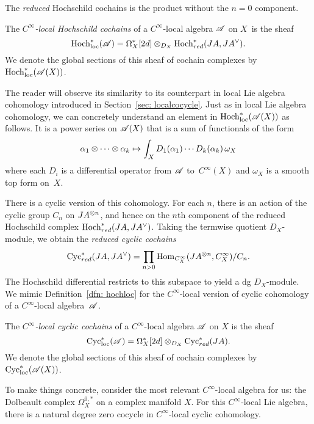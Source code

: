 The {\em reduced} Hochschild cochains is the product without the $n=0$ component. 

\def\Hoch{{\rm Hoch}}
\def\Hochloc{{\rm Hoch}_{\rm loc}}
\def\Cyc{{\rm Cyc}}
\def\Cycloc{{\rm Cyc}_{\rm loc}}

\begin{dfn}\label{dfn: hochloc}
The {\em $C^\infty$-local Hochschild cochains} of a $C^\infty$-local algebra $\mathscr A$ on $X$~is the sheaf
\[
\Hochloc^*(\sA) = \Omega^*_X[2d] \tensor_{D_X} \Hoch^*_{red} (JA, JA^\vee) .
\] 
We denote the global sections of this sheaf of cochain complexes by~$\Hochloc^*(\sA(X))$.
\end{dfn}

The reader will observe its similarity to its counterpart in local Lie algebra cohomology introduced in Section~\ref{sec: localcocycle}. 
Just as in local Lie algebra cohomology, we can concretely understand an element in $\Hochloc^*(\sA(X))$ as follows.
It is a power series on $\mathscr A(X)$ that is a sum of functionals of the form
\[
\alpha_1 \otimes \cdots \otimes \alpha_k \mapsto \int_X  D_1(\alpha_1) \cdots D_k(\alpha_k) \, \omega_X
\]
where each $D_i$ is a differential operator from $\mathscr A$ to~$C^\infty(X)$ and $\omega_X$ is a smooth top form on~$X$. 

There is a cyclic version of this cohomology.
For each $n$, there is an action of the cyclic group $C_n$ on $JA^{\otimes n}$,
and hence on the $n$th component of the reduced Hochschild complex $\Hoch_{red}^* (JA, JA^\vee)$.
Taking the termwise quotient $D_X$-module, we obtain the {\em reduced cyclic cochains}
\[
\Cyc_{red}^* (JA, JA^\vee) = \prod_{n > 0} {\rm Hom}_{C^\infty_X} (JA^{\tensor n}, C^\infty_X) / C_n .
\]
The Hochschild differential restricts to this subspace to yield a dg $D_X$-module. 
We mimic Definition~\ref{dfn: hochloc} for the $C^\infty$-local version of cyclic cohomology of a $C^\infty$-local algebra~$\mathscr A$. 

\begin{dfn}\label{dfn: cycloc}
The {\em $C^\infty$-local cyclic cochains} of a $C^\infty$-local algebra $\mathscr A$ on $X$ is the sheaf
\[
\Cycloc^*(\sA) = \Omega^*_X[2d] \tensor_{D_X} \Cyc^*_{red} (JA) .
\] 
We denote the global sections of this sheaf of cochain complexes by~$\Cycloc^*(\sA(X))$.
\end{dfn}

To make things concrete, 
consider the most relevant $C^\infty$-local algebra for us: the Dolbeault complex $\Omega^{0,*}_X$ on a complex manifold $X$. 
For this $C^\infty$-local Lie algebra, there is a natural degree zero cocycle in $C^\infty$-local cyclic cohomology.

